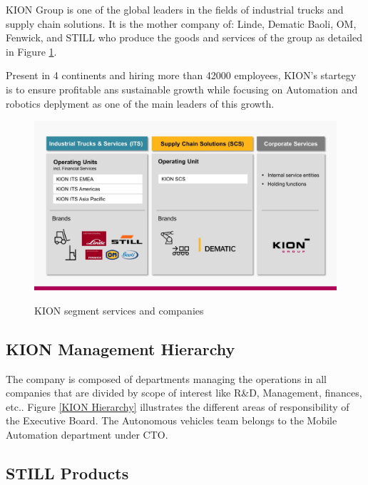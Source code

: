 KION Group is one of the global leaders in the fields of industrial trucks and supply chain solutions.
It is the mother company of: Linde, Dematic Baoli, OM, Fenwick, and STILL who produce the goods and services of the group as 
detailed in Figure \ref{KION Segments}. 

Present in 4 continents and hiring more than 42000 employees, KION's startegy is to ensure profitable ans sustainable growth 
while focusing on Automation and robotics deplyment as one of the main leaders of this growth. 

\begin{figure}[H]
    \begin{center}
    \includegraphics[width=5in]{images/Chap0/KION_Segments.jpg}\\
    \caption{KION segment services and companies \cite{R1}}
    \label{KION Segments}
    \end{center}
    \end{figure}

    
\subsection{KION Management Hierarchy}

The company is composed of departments managing the operations in all companies that are divided by scope of 
interest like R\&D, Management, finances, etc.. Figure \ref{KION Hierarchy} illustrates the different areas of 
responsibility of the Executive
Board. The Autonomous vehicles team belongs to the Mobile Automation department under CTO. 

\subsection{STILL Products}

